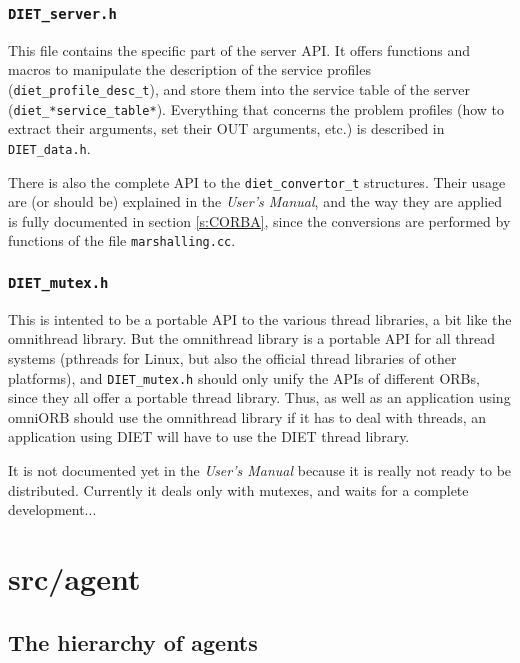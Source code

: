 \subsubsection{\tt DIET\_server.h}

This file contains the specific part of the server API.
It offers functions and macros to manipulate the description of the service
profiles (\verb+diet_profile_desc_t+), and store them into the service table of
the server (\verb+diet_*service_table*+). Everything that concerns the problem
profiles (how to extract their arguments, set their OUT arguments, etc.) is
described in \texttt{DIET\_data.h}.


There is also the complete API to the \texttt{diet\_convertor\_t} structures.
Their usage are (or should be) explained in the \textit{User's Manual}, and the
way they are applied is fully documented in section \ref{s:CORBA}, since the
conversions are performed by functions of the file \texttt{marshalling.cc}.

\subsubsection{\tt DIET\_mutex.h} 

This is intented to be a portable API to the various thread libraries, a bit
like the \textsf{omnithread} library. But the \textsf{omnithread} library is a
portable API for all thread systems (pthreads for Linux, but also the official
thread libraries of other platforms), and {\tt DIET\_mutex.h} should only unify
the APIs of different ORBs, since they all offer a portable thread library.
Thus, as well as an application using \textsf{omniORB} should use the
\textsf{omnithread} library if it has to deal with threads, an application using
DIET will have to use the DIET thread library.

It is not documented yet in the \textit{User's Manual} because it is really not
ready to be distributed. Currently it deals only with mutexes, and waits for a
complete development...



\section{\textsf{src/agent}}
\label{s:agent}

\subsection{The hierarchy of agents}

